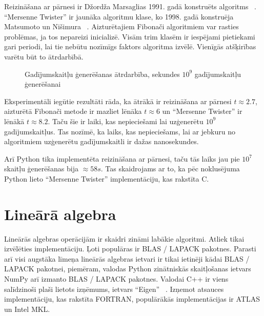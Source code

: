 \documentclass{ludis}
\begin{document}
Reizināšana ar pārnesi ir Džordža Marsaglias 1991. gadā konstruēts algoritms ~\cite{rng_new_marsaglia}. ``Mersenne Twister'' ir jaunāka algoritmu klase, ko 1998. gadā konstruēja Matsumoto un Nišimura ~\cite{rng_mersenne}. Aizturētajiem Fibonači algoritmiem var rasties problēmas, ja tos nepareizi inicializē. Visām trim klasēm ir iespējami pietiekami gari periodi, lai tie nebūtu nozīmīgs faktors algoritma izvēlē. Vienīgās atšķirības varētu būt to ātrdarbībā. 
\newpage
\begin{figure}
  \centering
  \caption[Gadījumskaitļu ģeneratoru ātrdarbība]{Gadījumskaitļu ģenerēšanas ātrdarbība, sekundes $10^9$ gadījumskaitļu ģenerēšanai\footnotemark}
  \label{fig:rng_performance}
\end{figure}
Eksperimentāli iegūtie rezultāti rāda, ka ātrākā ir reizināšana ar pārnesi $t \approx 2.7$, aizturētā Fibonači metode ir mazliet lēnāka $t \approx 6$ un ``Mersenne Twister'' ir lēnākā $t \approx 8.2$. Taču šie ir laiki, kas nepieciešami lai uzģenerētu $10^9$ gadījumskaitļus. Tas nozīmē, ka laiks, kas nepieciešams, lai ar jebkuru no algoritmiem uzģenerētu gadījumskaitli ir dažas nanosekundes.

Arī Python tika implementēta reizināšana ar pārnesi, taču tās laiks jau pie $10^7$ skaitļu ģenerēšanas bija $\approx 58 s$. Tas skaidrojams ar to, ka pēc noklusējuma Python lieto ``Mersenne Twister'' implementāciju, kas rakstīta C.

\section{Lineārā algebra}
Lineārās algebras operācijām ir skaidri zināmi labākie algoritmi. Atliek tikai izvēlēties implementāciju. Ļoti populāras ir BLAS / LAPACK pakotnes. Parasti arī visi augstāka līmeņa lineārās algebras ietvari ir tikai ietinēji kādai BLAS / LAPACK pakotnei, piemēram, valodas Python zinātniskās skaitļošanas ietvars NumPy arī izmanto BLAS / LAPACK pakotnes. Valodai C++ ir viens salīdzinoši plaši lietots izņēmums, ietvars ``Eigen'' ~\cite{eigen_org}.  Izņemot atsauces implementāciju, kas rakstīta FORTRAN, populārākās implementācijas ir ATLAS un Intel MKL.
\end{document}
